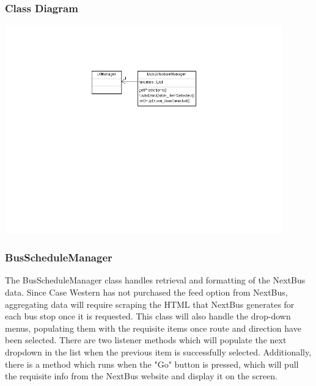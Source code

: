 \documentclass[pdftex,12pt,letter]{article}
\begin{document}
\subsubsection{Class Diagram}
\begin{flushleft}
\includegraphics[width=120mm]{nextbusCD.png}
\end{flushleft}
\subsubsection{BusScheduleManager}
The BusScheduleManager class handles retrieval and formatting of the NextBus data. Since Case Western has not purchased the feed option from NextBus, aggregating data will require scraping the HTML that NextBus generates for each bus stop once it is requested. This class will also handle the drop-down menus, populating them with the requisite items once route and direction have been selected. There are two listener methods which will populate the next dropdown in the list when the previous item is successfully selected. Additionally, there is a method which runs when the "Go" button is pressed, which will pull the requisite info from the NextBus website and display it on the screen.
\end{document}
